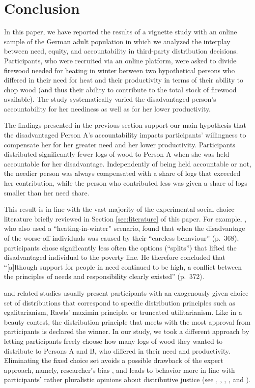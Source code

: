 \documentclass[smallcondensed]{svjour3}
\begin{document}
\section{Conclusion}\label{sec:conclusion}
%
In this paper, we have reported the results of a vignette study with an online sample of the German adult population in which we analyzed the interplay between need, equity, and accountability in third-party distribution decisions. Participants, who were recruited via an online platform, were asked to divide firewood needed for heating in winter between two hypothetical persons who differed in their need for heat and their productivity in terms of their ability to chop wood (and thus their ability to contribute to the total stock of firewood available). The study systematically varied the disadvantaged person's accountability for her neediness as well as for her lower productivity.\par
%
The findings presented in the previous section support our main hypothesis that the disadvantaged Person A's accountability impacts participants' willingness to compensate her for her greater need and her lower productivity. Participants distributed significantly fewer logs of wood to Person A when she was held accountable for her disadvantage. Independently of being held accountable or not, the needier person was always compensated with a share of logs that exceeded her contribution, while the person who contributed less was given a share of logs smaller than her need share.\par
%
This result is in line with the vast majority of the experimental social choice literature briefly reviewed in Section \ref{sec:literature} of this paper. For example, \citet{schwettmann_competing_2012}, who also used a ``heating-in-winter'' scenario, found that when the disadvantage of the worse-off individuals was caused by their ``careless behaviour'' (p.~368), participants chose significantly less often the options (``splits'') that lifted the disadvantaged individual to the poverty line. He therefore concluded that ``[a]lthough support for people in need continued to be high, a conflict between the principles of needs and responsibility clearly existed'' (p.~372).\par
%
\citet{schwettmann_competing_2012} and related studies usually present participants with an exogenously given choice set of distributions that correspond to specific distribution principles such as egalitarianism, Rawls' maximin principle, or truncated utilitarianism. Like in a beauty contest, the distribution principle that meets with the most approval from participants is declared the winner. In our study, we took a different approach by letting participants freely choose how many logs of wood they wanted to distribute to Persons A and B, who differed in their need and productivity. Eliminating the fixed choice set avoids a possible drawback of the expert approach, namely, researcher's bias \citep{ahlert_thresholds_2012}, and leads to behavior more in line with participants' rather pluralistic opinions about distributive justice (see \citealt{schokkaert_m_1999}, \citealt{amiel_thinking_1999}, \citealt{konow_which_2003}, \citealt{traub_friedman_2005}, and \citealt{ahlert_thresholds_2012}).\par
\end{document}
